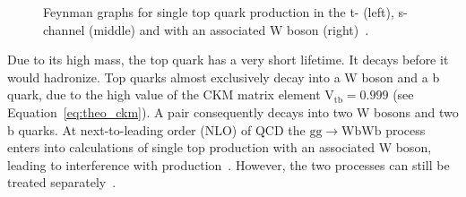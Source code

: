 \begin{figure}[htbp!]
  \begin{center}
\caption{Feynman graphs for single top quark production in the t- (left), s-channel (middle) and with an associated W boson (right)~\cite{Husemann:2017eka}. 
  \label{fig:theo_stfeyn}}
  \end{center}
\end{figure}

Due to its high mass, the top quark has a very short lifetime. It decays before it would hadronize.
Top quarks almost exclusively decay into a W boson and a b quark, due to the high value of the CKM matrix element $\mathrm{V}_{\mathrm{tb}} = 0.999$ (see Equation~\ref{eq:theo_ckm}).
A \ttbar pair consequently decays into two W bosons and two b quarks. At next-to-leading order (NLO) of QCD the $\mathrm{gg} \rightarrow \mathrm{WbWb}$ process enters into calculations of single top production with an 
associated W boson, leading to interference with \ttbar production~\cite{Cascioli:2013wga}. However, the two processes can still be treated separately~\cite{White:2009yt}.

